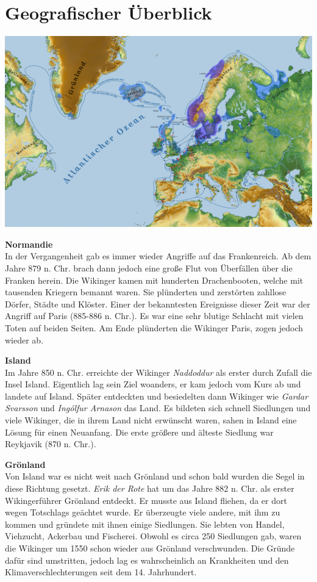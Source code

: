 \documentclass[12pt,a4paper,ngerman,openany]{book}
\begin{document}
\section{Geografischer Überblick}
\begin{center}
  \hspace*{-2.35cm}
  \includegraphics[width=0.9\paperwidth]{siedlungspunkte.png}
\end{center}

\textbf{Normandie}\\
In der Vergangenheit gab es immer wieder Angriffe auf das Frankenreich. Ab dem Jahre 879 n. Chr. brach dann jedoch eine große Flut von Überfällen über die Franken herein. Die Wikinger kamen mit hunderten Drachenbooten, welche mit tausenden Kriegern bemannt waren. Sie plünderten und zerstörten zahllose Dörfer, Städte und Klöster. Einer der bekanntesten Ereignisse dieser Zeit war der Angriff auf Paris (885-886 n. Chr.). Es war eine sehr blutige Schlacht mit vielen Toten auf beiden Seiten.
Am Ende plünderten die Wikinger Paris, zogen jedoch wieder ab.

\textbf{Island}\\
Im Jahre 850 n. Chr. erreichte der Wikinger \textit{Naddoddur} als erster durch Zufall die Insel Island. Eigentlich lag sein Ziel woanders, er kam jedoch vom Kurs ab und landete auf Island. Später entdeckten und besiedelten dann Wikinger wie \textit{Gardar Svarsson} und \textit{Ingólfur Arnason} das Land. Es bildeten sich schnell Siedlungen und viele Wikinger, die in ihrem Land nicht erwünscht waren, sahen in Island eine Lösung für einen Neuanfang. Die erste größere und älteste Siedlung war Reykjavik (870 n. Chr.). 

\textbf{Grönland}\\
Von Island war es nicht weit nach Grönland und schon bald wurden die Segel in diese Richtung gesetzt. \textit{Erik der Rote} hat um das Jahre 882 n. Chr. als erster Wikingerführer Grönland entdeckt. Er musste aus Island fliehen, da er dort wegen Totschlags geächtet wurde. Er überzeugte viele andere, mit ihm zu kommen und gründete mit ihnen einige Siedlungen. Sie lebten von Handel, Viehzucht, Ackerbau und Fischerei. Obwohl es circa 250 Siedlungen gab, waren die Wikinger um 1550 schon wieder aus Grönland verschwunden. Die Gründe dafür sind umstritten, jedoch lag es wahrscheinlich an Krankheiten und den Klimaverschlechterungen seit dem 14. Jahrhundert.
\end{document}
